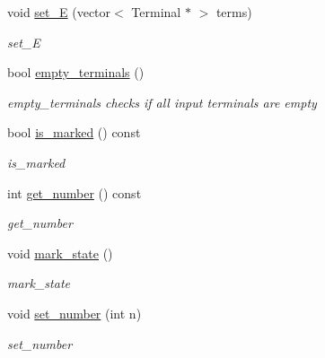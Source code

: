 \begin{DoxyCompactItemize}
\item 
void \hyperlink{class_behavior_state_a0d69afa6c7dffa10fab23027a4c8dc94}{set\+\_\+E} (vector$<$ Terminal $\ast$ $>$ terms)
\begin{DoxyCompactList}\small\item\em set\+\_\+E \end{DoxyCompactList}\item 
bool \hyperlink{class_behavior_state_ac110a160dab521de33f74168933797d5}{empty\+\_\+terminals} ()
\begin{DoxyCompactList}\small\item\em empty\+\_\+terminals checks if all input terminals are empty \end{DoxyCompactList}\item 
bool \hyperlink{class_behavior_state_ae75691fc27d4d4ee98e67ecf483d144e}{is\+\_\+marked} () const 
\begin{DoxyCompactList}\small\item\em is\+\_\+marked \end{DoxyCompactList}\item 
int \hyperlink{class_behavior_state_a7229a844be3ebd72a985b39d7ff51150}{get\+\_\+number} () const 
\begin{DoxyCompactList}\small\item\em get\+\_\+number \end{DoxyCompactList}\item 
void \hyperlink{class_behavior_state_a8378fa26dc29e847fbadf2ff55ba2d7d}{mark\+\_\+state} ()\hypertarget{class_behavior_state_a8378fa26dc29e847fbadf2ff55ba2d7d}{}\label{class_behavior_state_a8378fa26dc29e847fbadf2ff55ba2d7d}

\begin{DoxyCompactList}\small\item\em mark\+\_\+state \end{DoxyCompactList}\item 
void \hyperlink{class_behavior_state_ae58c468875e1c1559fdcbb262c378d7c}{set\+\_\+number} (int n)
\begin{DoxyCompactList}\small\item\em set\+\_\+number \end{DoxyCompactList}\end{DoxyCompactItemize}

